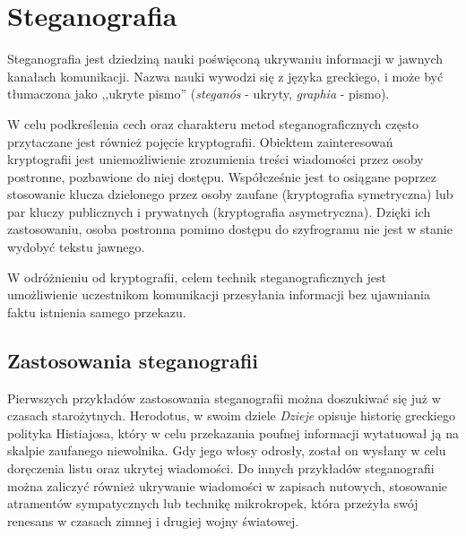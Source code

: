 
\chapter{Steganografia}\label{chap:steganography}
{

    Steganografia jest dziedziną nauki poświęconą ukrywaniu informacji w jawnych kanałach komunikacji. Nazwa nauki
    wywodzi się z języka greckiego, i może być tłumaczona jako ,,ukryte pismo'' (\textit{steganós} - ukryty,
    \textit{graphia} - pismo).

    W celu podkreślenia cech oraz charakteru metod steganograficznych często przytaczane jest również pojęcie
    kryptografii. Obiektem zainteresowań kryptografii jest uniemożliwienie zrozumienia treści wiadomości przez osoby
    postronne, pozbawione do niej dostępu. Współcześnie jest to osiągane poprzez stosowanie klucza dzielonego przez
    osoby zaufane (kryptografia symetryczna) lub par kluczy publicznych i prywatnych (kryptografia asymetryczna). Dzięki
    ich zastosowaniu, osoba postronna pomimo dostępu do szyfrogramu nie jest w stanie wydobyć tekstu jawnego.

    W odróżnieniu od kryptografii, celem technik steganograficznych jest umożliwienie uczestnikom komunikacji
    przesyłania informacji bez ujawniania faktu istnienia samego przekazu.

    \section{Zastosowania steganografii}
    {
        Pierwszych przykładów zastosowania steganografii można doszukiwać się już w czasach
        starożytnych\cite{Petitcolas1999InformationHS}. Herodotus, w swoim dziele \textit{Dzieje} opisuje historię
        greckiego polityka Histiajosa, który w celu przekazania poufnej informacji wytatuował ją na skalpie zaufanego
        niewolnika. Gdy jego włosy odrosły, został on wysłany w celu doręczenia listu oraz ukrytej wiadomości. Do innych
        przykładów steganografii można zaliczyć również ukrywanie wiadomości w zapisach nutowych, stosowanie atramentów
        sympatycznych lub technikę mikrokropek\cite{Petitcolas1999InformationHS}, która przeżyła swój renesans w czasach
        zimnej i drugiej wojny światowej.

}}
